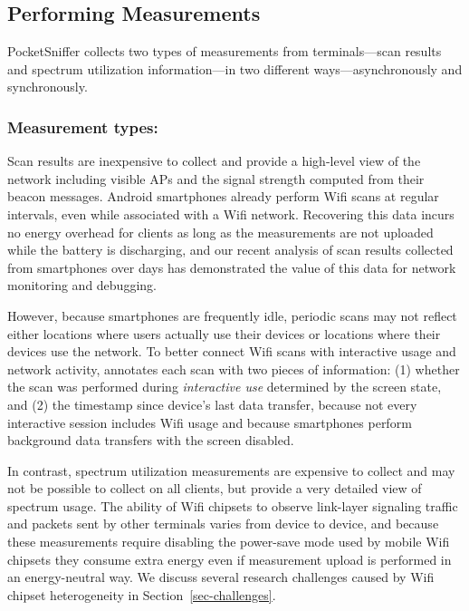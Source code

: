 \subsection{Performing Measurements}
\label{subsec-measurement}

PocketSniffer collects two types of measurements from terminals---scan
results and spectrum utilization information---in two different
ways---asynchronously and synchronously.

\subsubsection{Measurement types:\space} Scan results are inexpensive to
collect and provide a high-level view of the network including visible APs
and the signal strength computed from their beacon messages. Android
smartphones already perform Wifi scans at regular intervals, even while
associated with a Wifi network. Recovering this data incurs no energy
overhead for clients as long as the measurements are not uploaded while the
battery is discharging, and our recent analysis of  scan
results collected from  smartphones over  days
has demonstrated the value of this data for network monitoring and debugging.

However, because smartphones are frequently idle, periodic scans may not
reflect either locations where users actually use their devices or locations
where their devices use the network. To better connect Wifi scans with
interactive usage and network activity, \PS{} annotates each scan with two
pieces of information: (1) whether the scan was performed during
\textit{interactive use} determined by the screen state, and (2) the
timestamp since device's last data transfer, because not every interactive
session includes Wifi usage and because smartphones perform background data
transfers with the screen disabled.

In contrast, spectrum utilization measurements are expensive to collect and
may not be possible to collect on all clients, but provide a very detailed
view of spectrum usage. The ability of Wifi chipsets to observe link-layer
signaling traffic and packets sent by other terminals varies from device to
device, and because these measurements require disabling the power-save mode
used by mobile Wifi chipsets they consume extra energy even if measurement
upload is performed in an energy-neutral way. We discuss several research
challenges caused by Wifi chipset heterogeneity in
Section~\ref{sec-challenges}.

